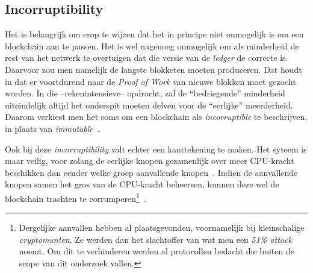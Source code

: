 \subsection{Incorruptibility}
\label{sub:incorruptibility}

Het is belangrijk om erop te wijzen dat het in principe niet onmogelijk is om een blockchain aan te passen. Het is wel nagenoeg onmogelijk om als minderheid de rest van het netwerk te overtuigen dat die versie van de \textit{ledger} de correcte is. Daarvoor zou men namelijk de langste blokketen moeten produceren. Dat houdt in dat er voortdurend naar de \textit{Proof of Work} van nieuwe blokken moet gezocht worden. In die --rekenintensieve-- opdracht, zal de ``bedriegende'' minderheid uiteindelijk altijd het onderspit moeten delven voor de ``eerlijke'' meerderheid. Daarom verkiest men het soms om een blockchain als \textit{incorruptible} te beschrijven, in plaats van \textit{immutable}~\autocite{Salem2008}.

Ook bij deze \textit{incorruptibility} valt echter een kanttekening te maken. Het syteem is maar veilig, voor zolang de eerlijke knopen gezamenlijk over meer CPU-kracht beschikken dan eender welke groep aanvallende knopen~\autocite{Nakamoto2008}. Indien de aanvallende knopen samen het gros van de CPU-kracht beheersen, kunnen deze wel de blockchain trachten te corrumperen\footnote{Dergelijke aanvallen hebben al plaatsgevonden, voornamelijk bij kleinschalige \textit{cryptomunten}. Ze werden dan het slachtoffer van wat men een \textit{51\% attack} noemt. Om dit te verhinderen werden al protocollen bedacht die buiten de scope van dit onderzoek vallen.}~\autocite{Anita2019}.


